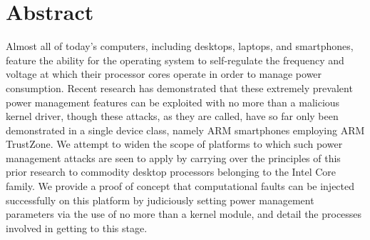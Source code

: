 {%
    \chapter*{Abstract}

    Almost all of today's computers, including desktops, laptops, and
    smartphones, feature the ability for the operating system to self-regulate
    the frequency and voltage at which their processor cores operate in order
    to manage power consumption. Recent research has demonstrated that these
    extremely prevalent power management features can be exploited with no more
    than a malicious kernel driver, though these \clkscrew{} attacks, as they
    are called, have so far only been demonstrated in a single device class,
    namely ARM smartphones employing ARM TrustZone. We attempt to widen the
    scope of platforms to which such power management attacks are seen to apply
    by carrying over the principles of this prior research to commodity desktop
    processors belonging to the Intel Core family. We provide a proof of
    concept that computational faults can be injected successfully on this
    platform by judiciously setting power management parameters via the use of
    no more than a kernel module, and detail the processes involved in getting
    to this stage.
}
